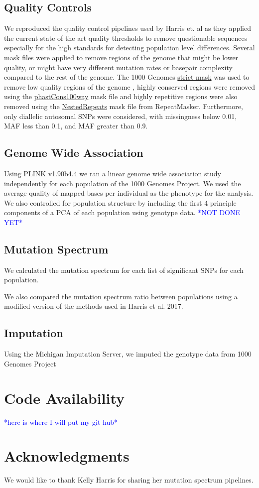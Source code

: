 \documentclass[9pt,lineno]{elife}
\newcommand{\todo}[1]{\textcolor{blue}{*#1*}}
\begin{document}
\subsection{Quality Controls}
We reproduced the quality control pipelines used by Harris et. al as they applied the current state of the art quality thresholds to remove questionable sequences especially for the high standards for detecting population level differences. 
Several mask files were applied to remove regions of the genome that might be lower quality, or might have very different mutation rates or basepair complexity compared to the rest of the genome. 
The  1000 Genomes \href{http://ftp.1000genomes.ebi.ac.uk/vol1/ftp/release/20130502/supporting/accessible_genome_masks/20141020.strict_mask.whole_genome.bed}{strict mask} was used to remove low quality regions of the genome , highly conserved regions were removed using the \href{http://hgdownload.cse.ucsc.edu/goldenPath/hg19/database/phastConsElements100way.txt.gz}{phastCons100way} mask file and highly repetitive regions were also removed using the \href{http://hgdownload.cse.ucsc.edu/goldenpath/hg19/database/nestedRepeats.txt.gz}{NestedRepeats} mask file from RepeatMasker. 
Furthermore, only diallelic autosomal SNPs were considered, with missingness below 0.01, MAF less than 0.1, and MAF greater than 0.9.

\subsection{Genome Wide Association}

Using PLINK v1.90b4.4 we ran a linear genome wide association study independently for each population of the 1000 Genomes Project. We used the average quality of mapped bases per individual as the phenotype for the analysis. We also controlled for population structure by including the first 4 principle components of a PCA of each population using genotype data. \todo{NOT DONE YET}

\subsection{Mutation Spectrum}
We calculated the mutation spectrum for each list of significant SNPs for each population.  

We also compared the mutation spectrum ratio between populations using a modified version of the methods used in Harris et al. 2017. 

\subsection{Imputation}
Using the Michigan Imputation Server, we imputed the genotype data from 1000 Genomes Project


\section{Code Availability}
\todo{here is where I will put my git hub}

\section{Acknowledgments}
We would like to thank Kelly Harris for sharing her mutation spectrum pipelines.
  
\end{document}
